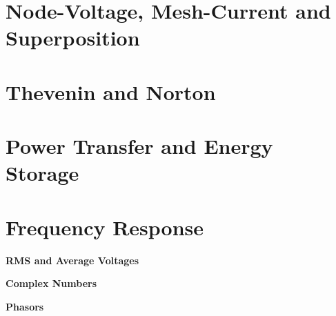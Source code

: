 \documentclass[10pt,a4paper]{memoir}
\begin{document}
\chapter{Node-Voltage, Mesh-Current and Superposition}
\chapter{Thevenin and Norton}
\chapter{Power Transfer and Energy Storage}

\chapter{Frequency Response}
\newpage
\begin{question}
  \textbf{RMS and Average Voltages}
  \begin{figure}[!h]
    \centering
    \missingfigure[figwidth=6cm]{}
    \caption{}
  \end{figure}
\end{question}

\newpage
\begin{question}
  \textbf{Complex Numbers}
  \begin{figure}[!h]
    \centering
    \missingfigure[figwidth=6cm]{}
    \caption{}
  \end{figure}
\end{question}

\newpage
\begin{question}
  \textbf{Phasors}
  \begin{figure}[!h]
    \centering
    \missingfigure[figwidth=6cm]{}
    \caption{}
  \end{figure}
\end{question}
\end{document}
